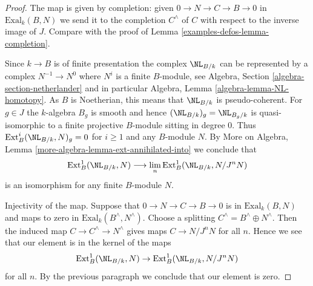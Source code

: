 \begin{proof}
The map is given by completion: given $0 \to N \to C \to B \to 0$
in $\text{Exal}_k(B, N)$ we send it to the completion $C^\wedge$
of $C$ with respect to the inverse image of $J$. Compare with
the proof of Lemma \ref{examples-defos-lemma-completion}.

\medskip\noindent
Since $k \to B$ is of finite presentation the complex
$\NL_{B/k}$ can be represented by a complex
$N^{-1} \to N^0$ where $N^i$ is a finite $B$-module, see
Algebra, Section \ref{algebra-section-netherlander} and
in particular
Algebra, Lemma \ref{algebra-lemma-NL-homotopy}.
As $B$ is Noetherian, this means that $\NL_{B/k}$
is pseudo-coherent. For $g \in J$ the $k$-algebra $B_g$
is smooth and hence $(\NL_{B/k})_g = \NL_{B_g/k}$
is quasi-isomorphic to a finite projective $B$-module sitting in degree $0$.
Thus $\text{Ext}^i_B(\NL_{B/k}, N)_g = 0$ for $i \geq 1$
and any $B$-module $N$. By
More on Algebra, Lemma \ref{more-algebra-lemma-ext-annihilated-into}
we conclude that
$$
\text{Ext}^1_B(\NL_{B/k}, N) \longrightarrow
\lim_n \text{Ext}^1_B(\NL_{B/k}, N/J^n N)
$$
is an isomorphism for any finite $B$-module $N$.

\medskip\noindent
Injectivity of the map.
Suppose that $0 \to N \to C \to B \to 0$ is in $\text{Exal}_k(B, N)$
and maps to zero in $\text{Exal}_k(B^\wedge, N^\wedge)$.
Choose a splitting $C^\wedge = B^\wedge \oplus N^\wedge$.
Then the induced map $C \to C^\wedge \to N^\wedge$
gives maps $C \to N/J^nN$ for all $n$.
Hence we see that our element is in the kernel of the maps
$$
\text{Ext}^1_B(\NL_{B/k}, N) \to
\text{Ext}^1_B(\NL_{B/k}, N/J^n N)
$$
for all $n$. By the previous paragraph we conclude that
our element is zero.


\end{proof}

